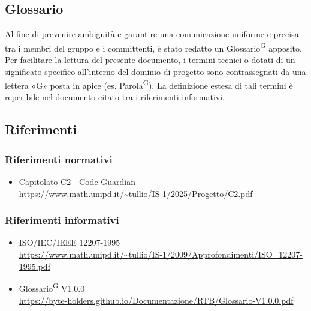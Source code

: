 \documentclass[a4paper, 11pt]{article}
\begin{document}
\subsection{Glossario}
Al fine di prevenire ambiguità e garantire una comunicazione uniforme e precisa tra i membri del gruppo e i committenti, è stato redatto un Glossario\textsuperscript{G} apposito.
Per facilitare la lettura del presente documento, i termini tecnici o dotati di un significato specifico all'interno del dominio di progetto sono contrassegnati da una lettera «G» posta in apice (es. Parola\textsuperscript{G}).
La definizione estesa di tali termini è reperibile nel documento citato tra i riferimenti informativi.

\subsection{Riferimenti}
\subsubsection{Riferimenti normativi}
\begin{itemize}
    \item 
		Capitolato C2 - Code Guardian\\
		\url{https://www.math.unipd.it/~tullio/IS-1/2025/Progetto/C2.pdf}
\end{itemize}
\subsubsection{Riferimenti informativi}
\begin{itemize}
	\item ISO/IEC/IEEE 12207-1995\\
		\url{https://www.math.unipd.it/~tullio/IS-1/2009/Approfondimenti/ISO_12207-1995.pdf}
	\item
    	Glossario\textsuperscript{G} V1.0.0\\
        \url{https://byte-holders.github.io/Documentazione/RTB/Glossario-V1.0.0.pdf}
\end{itemize}
\end{document}
